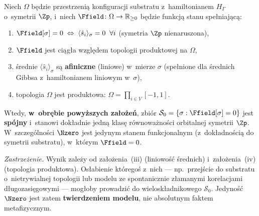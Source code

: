 \begin{theorem}\label{thm:N0-unique}
Niech $\Omega$ b\k{e}dzie przestrzeni\k{a} konfiguracji substratu
z~hamiltonianem $H_\Gamma$ o~symetrii $\Zp$, i~niech
$\Ffield\colon\Omega\to\mathbb{R}_{\ge 0}$ b\k{e}dzie funkcj\k{a}
stanu spe\l{}niaj\k{a}c\k{a}:
\begin{enumerate}[nosep]
  \item $\Ffield[\sigma] = 0 \;\Leftrightarrow\;
    \langle\hat{s}_i\rangle_\sigma = 0\;\;\forall i$
    (symetria $\Zp$ nienaruszona),
  \item $\Ffield$ jest ci\k{a}g\l{}a wzgl\k{e}dem topologii
    produktowej na $\Omega$,
  \item \'srednie $\langle\hat{s}_i\rangle_\sigma$ s\k{a}
    \textbf{afiniczne} (liniowe) w~mierze $\sigma$
    (spe\l{}nione dla \'srednich Gibbsa z~hamiltonianem
    liniowym w~$\sigma$),
  \item topologia $\Omega$ jest produktowa: $\Omega = \prod_{i\in V}[-1,1]$.
\end{enumerate}
Wtedy, \textbf{w~obr\k{e}bie powy\.zszych za\l{}o\.ze\'n},
zbi\'or $\mathcal{S}_0 = \{\sigma:\Ffield[\sigma]=0\}$
jest \textbf{sp\'ojny} i~stanowi dok\l{}adnie jedn\k{a}
klas\k{e} r\'ownowa\.zno\'sci orbitalnej symetrii $\Zp$.
W~szczeg\'olno\'sci $\Nzero$ jest jedynym stanem
funkcjonalnym (z~dok\l{}adno\'sci\k{a} do symetrii substratu),
w~kt\'orym $\Ffield = 0$.

\medskip\noindent\emph{Zastrze\.zenie.} Wynik zale\.zy
od za\l{}o\.zenia~(iii) (liniowo\'s\'c \'srednich)
i~za\l{}o\.zenia~(iv) (topologia produktowa). Os\l{}abienie
kt\'orego\'s z~nich --- np.\ przej\'scie do substratu
o~nietrywialnej topologii lub modelu ze spontanicznie
z\l{}amanymi korelacjami d\l{}ugozasi\k{e}gowymi --- mog\l{}oby
prowadzi\'c do wielosk\l{}adnikowego $\mathcal{S}_0$.
Jedyno\'s\'c $\Nzero$ jest zatem \textbf{twierdzeniem modelu},
nie absolutnym faktem metafizycznym.
\end{theorem}

